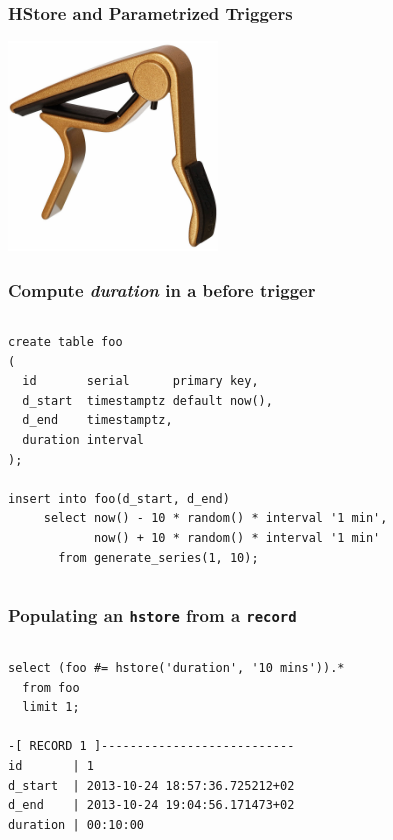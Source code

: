 \documentclass{beamer}
\begin{document}
\begin{frame}[fragile]
  \frametitle{HStore and Parametrized Triggers}

\begin{center}
  \includegraphics[height=15em]{dunlop-trigger-84fg-gold.jpg}
\end{center}
\end{frame}

\begin{frame}[fragile]
  \frametitle{Compute \textit{duration} in a before trigger}

  \vfill
  
\begin{columns}
\begin{verbatim}
create table foo
(
  id       serial      primary key,
  d_start  timestamptz default now(),
  d_end    timestamptz,
  duration interval
);

insert into foo(d_start, d_end)
     select now() - 10 * random() * interval '1 min',
            now() + 10 * random() * interval '1 min'
       from generate_series(1, 10);
\end{verbatim}  
\end{columns}
\end{frame}

\begin{frame}[fragile]
  \frametitle{Populating an \texttt{hstore} from a \texttt{record}}

  \vfill
  
\begin{columns}
\begin{verbatim}
select (foo #= hstore('duration', '10 mins')).*
  from foo
  limit 1;

-[ RECORD 1 ]---------------------------
id       | 1
d_start  | 2013-10-24 18:57:36.725212+02
d_end    | 2013-10-24 19:04:56.171473+02
duration | 00:10:00
\end{verbatim}  
\end{columns}
\end{frame}
\end{document}
